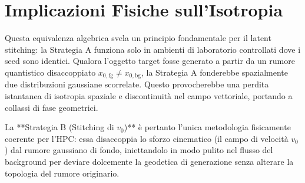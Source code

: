 \documentclass[12pt,a4paper]{report}
\begin{document}
\section{Implicazioni Fisiche sull'Isotropia}
Questa equivalenza algebrica svela un principio fondamentale per il latent stitching: la Strategia A funziona solo in ambienti di laboratorio controllati dove i seed sono identici. Qualora l'oggetto target fosse generato a partir da un rumore quantistico disaccoppiato $x_{0, \text{fg}} \neq x_{0, \text{bg}}$, la Strategia A fonderebbe spazialmente due distribuzioni gaussiane scorrelate. Questo provocherebbe una perdita istantanea di isotropia spaziale e discontinuità nel campo vettoriale, portando a collassi di fase geometrici.

La **Strategia B (Stitching di $v_0$)** è pertanto l'unica metodologia fisicamente coerente per l'HPC: essa disaccoppia lo sforzo cinematico (il campo di velocità $v_0$) dal rumore gaussiano di fondo, iniettandolo in modo pulito nel flusso del background per deviare dolcemente la geodetica di generazione senza alterare la topologia del rumore originario.
\end{document}
